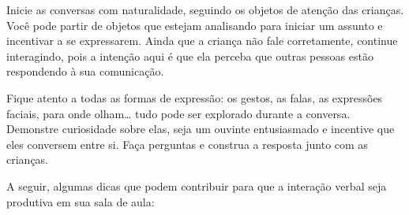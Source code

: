 \documentclass[11pt]{extarticle}
\begin{document}
Inicie as conversas com naturalidade, seguindo os objetos de atenção das crianças. 
Você pode partir de objetos que estejam analisando
para iniciar um assunto e incentivar a se expressarem. Ainda que a
criança não fale corretamente, continue interagindo, 
pois a intenção aqui é que ela perceba que outras pessoas estão respondendo 
à sua comunicação. 

Fique atento a todas as formas de expressão: os gestos, as falas, as 
expressões faciais, para onde olham\ldots{} tudo pode ser explorado durante a conversa. 
Demonstre curiosidade sobre elas, seja um ouvinte entusiasmado e incentive que eles 
conversem entre si. Faça perguntas e construa a resposta junto com as crianças. 

A seguir, algumas dicas que podem contribuir para que a interação verbal 
seja produtiva em sua sala de aula: 
\end{document}
